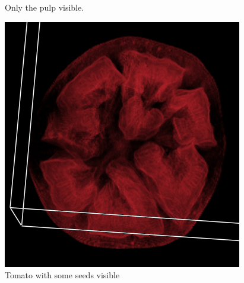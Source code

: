 \documentclass[a4paper,twoside,11pt]{article}
\begin{document}
\begin{figure}[htb]
  \caption{Only the pulp visible.}\label{tomateOp2}
\endminipage\hfill
{}%
  \includegraphics[width=\linewidth]{images/tomatoOp3}
  \caption{Tomato with some seeds visible}\label{tomatoOp3}
\endminipage
\end{figure}

 
\end{document}
